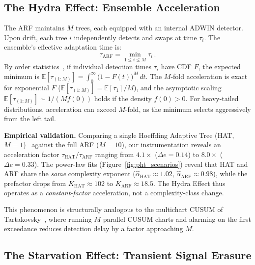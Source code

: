 \documentclass[10pt,conference]{IEEEtran}
\theoremstyle{definition}
\begin{document}
\subsection{The Hydra Effect: Ensemble Acceleration}\label{sec:hydra}

The ARF maintains $M$ trees, each equipped with an internal ADWIN detector.
Upon drift, each tree $i$ independently detects and swaps at time $\tau_i$.
The ensemble's effective adaptation time is:
\begin{equation}\label{eq:hydra}
  \tau_{\mathrm{ARF}} = \min_{1 \le i \le M} \tau_i\,.
\end{equation}
By order statistics~\cite{david_order_2003}, if individual detection times $\tau_i$ have CDF $F$, the expected minimum is $\mathbb{E}[\tau_{(1:M)}] = \int_0^{\infty} \bigl(1 - F(t)\bigr)^M \, dt$.
The $M$-fold acceleration is exact for exponential $F$ ($\mathbb{E}[\tau_{(1:M)}] = \mathbb{E}[\tau_1]/M$), and the asymptotic scaling $\mathbb{E}[\tau_{(1:M)}] \sim 1/(M f(0))$ holds if the density $f(0)>0$. For heavy-tailed distributions, acceleration can exceed $M$-fold, as the minimum selects aggressively from the left tail.

\textbf{Empirical validation.}
Comparing a single Hoeffding Adaptive Tree (HAT, $M = 1$)~\cite{bifet_hat_2009} against the full ARF ($M = 10$), our instrumentation reveals an acceleration factor $\tau_{\mathrm{HAT}} / \tau_{\mathrm{ARF}}$ ranging from $4.1\times$ ($\Delta e = 0.14$) to $8.0\times$ ($\Delta e = 0.33$). The power-law fits (Figure~\ref{fig:pht_scenarios}) reveal that HAT and ARF share the \emph{same} complexity exponent ($\hat\alpha_{\mathrm{HAT}} \approx 1.02$, $\hat\alpha_{\mathrm{ARF}} \approx 0.98$), while the prefactor drops from $K_{\mathrm{HAT}} \approx 102$ to $K_{\mathrm{ARF}} \approx 18.5$. The Hydra Effect thus operates as a \emph{constant-factor} acceleration, not a complexity-class change.

This phenomenon is structurally analogous to the multichart CUSUM of Tartakovsky~\cite{tartakovsky_2005_multichart}, where running $M$ parallel CUSUM charts and alarming on the first exceedance reduces detection delay by a factor approaching $M$.

\subsection{The Starvation Effect: Transient Signal Erasure}\label{sec:starvation}
\end{document}
